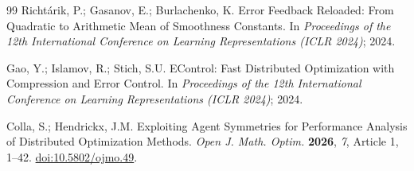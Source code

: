 \begin{thebibliography}{99}
Richt\'arik, P.; Gasanov, E.; Burlachenko, K.
Error Feedback Reloaded: From Quadratic to Arithmetic Mean of Smoothness Constants.
In \emph{Proceedings of the 12th International Conference on Learning Representations (ICLR 2024)};
2024.

Gao, Y.; Islamov, R.; Stich, S.U.
EControl: Fast Distributed Optimization with Compression and Error Control.
In \emph{Proceedings of the 12th International Conference on Learning Representations (ICLR 2024)};
2024.

Colla, S.; Hendrickx, J.M.
Exploiting Agent Symmetries for Performance Analysis of Distributed Optimization Methods.
\emph{Open J. Math. Optim.} \textbf{2026}, \emph{7}, Article 1, 1--42.
\href{https://doi.org/10.5802/ojmo.49}
{doi:10.5802/ojmo.49}.

\end{thebibliography}

